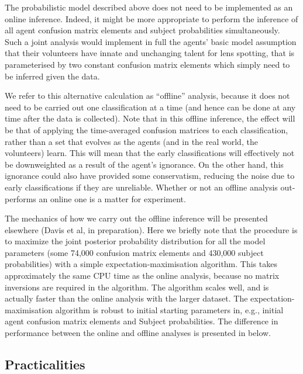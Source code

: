 \documentclass[useAMS,usenatbib,a4paper]{mn2e}
\begin{document}
The probabilistic model described above does not need to be implemented as an
online inference. Indeed, it might be more appropriate to perform the inference
of all agent confusion matrix elements and subject probabilities simultaneously.
Such a joint analysis would implement in full the agents' basic model assumption
that their volunteers have innate and unchanging talent for lens spotting, that
is parameterised by two constant confusion matrix elements which simply need to
be inferred given the data.

We refer to this alternative calculation as ``offline'' analysis, because it
does not need to be carried out one classification at a time (and hence can be
done at any time after the data is collected). Note that in this offline
inference, the effect will be that of applying the time-averaged confusion
matrices to each classification,  rather than a set that evolves as the agents
(and in the real world, the volunteers) learn. This will mean  that the early
classifications will effectively not be downweighted as a result of the agent's
ignorance. On the other hand, this ignorance could also have provided some
conservatism, reducing the noise due to early classifications if they are
unreliable. Whether or not an offline analysis out-performs an online one is a
matter for experiment.

The mechanics of how we carry out the offline inference  will be presented
elsewhere (Davis et al, in preparation). Here we briefly note that the procedure
is to maximize the joint posterior probability distribution for all the model
parameters (some 74,000 confusion matrix elements and 430,000 subject
probabilities) with a simple expectation-maximisation algorithm. This takes
approximately the same CPU time as the \StageTwo online analysis, because no
matrix inversions are required in the algorithm. The algorithm scales well, and
is actually faster than the online analysis with the larger \StageOne dataset.
The expectation-maximisation algorithm is robust to initial starting parameters
in, e.g., initial agent confusion matrix elements and Subject probabilities. The
difference in performance between the online and offline analyses is presented
in   below.



\subsection{Practicalities}
\label{sec:swap:practicalities}
\end{document}
